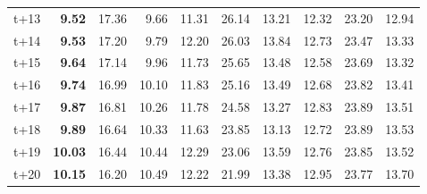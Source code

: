 \begin{table}[H]
\begin{tabular}{lrrrrrrrrr}
t+13  & \textbf{9.52}  & 17.36  & 9.66  & 11.31  & 26.14  & 13.21  & 12.32  & 23.20  & 12.94  \\
t+14  & \textbf{9.53}  & 17.20  & 9.79  & 12.20  & 26.03  & 13.84  & 12.73  & 23.47  & 13.33  \\
t+15  & \textbf{9.64}  & 17.14  & 9.96  & 11.73  & 25.65  & 13.48  & 12.58  & 23.69  & 13.32  \\
t+16  & \textbf{9.74}  & 16.99  & 10.10  & 11.83  & 25.16  & 13.49  & 12.68  & 23.82  & 13.41  \\
t+17  & \textbf{9.87}  & 16.81  & 10.26  & 11.78  & 24.58  & 13.27  & 12.83  & 23.89  & 13.51  \\
t+18  & \textbf{9.89}  & 16.64  & 10.33  & 11.63  & 23.85  & 13.13  & 12.72  & 23.89  & 13.53  \\
t+19  & \textbf{10.03}  & 16.44  & 10.44  & 12.29  & 23.06  & 13.59  & 12.76  & 23.85  & 13.52  \\
t+20  & \textbf{10.15}  & 16.20  & 10.49  & 12.22  & 21.99  & 13.38  & 12.95  & 23.77  & 13.70  \\

\bottomrule
\end{tabular}
\end{table}
